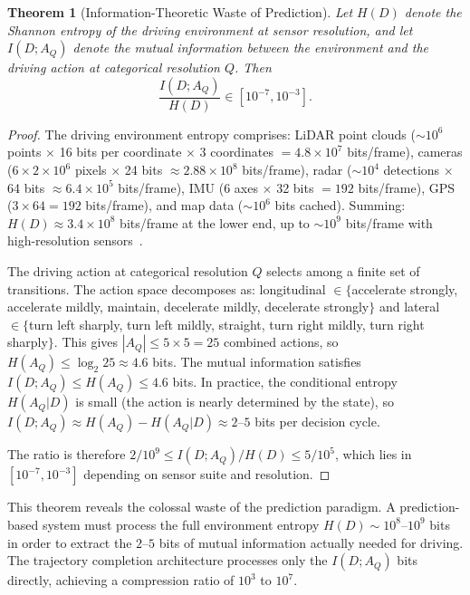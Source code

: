 \documentclass[twocolumn,10pt]{article}
\newtheorem{theorem}{Theorem}[section]
\theoremstyle{definition}
\begin{document}
\begin{theorem}[Information-Theoretic Waste of Prediction]
\label{thm:info-waste}
Let $H(D)$ denote the Shannon entropy of the driving environment at sensor resolution, and let $I(D; A_Q)$ denote the mutual information between the environment and the driving action at categorical resolution $Q$. Then
\begin{equation}
\frac{I(D; A_Q)}{H(D)} \in [10^{-7}, 10^{-3}].
\end{equation}
\end{theorem}

\begin{proof}
The driving environment entropy comprises: LiDAR point clouds ($\sim 10^6$ points $\times$ 16 bits per coordinate $\times$ 3 coordinates $= 4.8 \times 10^7$ bits/frame), cameras ($6 \times 2 \times 10^6$ pixels $\times$ 24 bits $\approx 2.88 \times 10^8$ bits/frame), radar ($\sim 10^4$ detections $\times$ 64 bits $\approx 6.4 \times 10^5$ bits/frame), IMU ($6$ axes $\times$ 32 bits $= 192$ bits/frame), GPS ($3 \times 64 = 192$ bits/frame), and map data ($\sim 10^6$ bits cached). Summing: $H(D) \approx 3.4 \times 10^8$ bits/frame at the lower end, up to $\sim 10^9$ bits/frame with high-resolution sensors~\cite{shannon1948,cover2006}.

The driving action at categorical resolution $Q$ selects among a finite set of transitions. The action space decomposes as: longitudinal $\in \{$accelerate strongly, accelerate mildly, maintain, decelerate mildly, decelerate strongly$\}$ and lateral $\in \{$turn left sharply, turn left mildly, straight, turn right mildly, turn right sharply$\}$. This gives $|A_Q| \leq 5 \times 5 = 25$ combined actions, so $H(A_Q) \leq \log_2 25 \approx 4.6$ bits. The mutual information satisfies $I(D; A_Q) \leq H(A_Q) \leq 4.6$ bits. In practice, the conditional entropy $H(A_Q | D)$ is small (the action is nearly determined by the state), so $I(D; A_Q) \approx H(A_Q) - H(A_Q | D) \approx 2$--$5$ bits per decision cycle.

The ratio is therefore $2/10^9 \leq I(D; A_Q)/H(D) \leq 5/10^5$, which lies in $[10^{-7}, 10^{-3}]$ depending on sensor suite and resolution.
\end{proof}

This theorem reveals the colossal waste of the prediction paradigm. A prediction-based system must process the full environment entropy $H(D) \sim 10^8$--$10^9$ bits in order to extract the $2$--$5$ bits of mutual information actually needed for driving. The trajectory completion architecture processes only the $I(D; A_Q)$ bits directly, achieving a compression ratio of $10^3$ to $10^7$.
\end{document}
